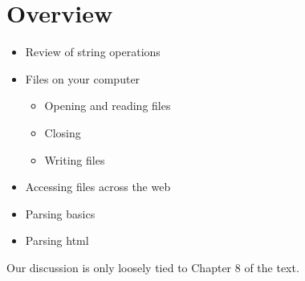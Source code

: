 \documentclass[letterpaper,10pt,english]{sphinxmanual}
\begin{document}
\section{Overview}
\label{\detokenize{lecture_notes/lec13_files_web:overview}}\begin{itemize}
\item {} 
Review of string operations

\item {} 
Files on your computer
\begin{itemize}
\item {} 
Opening and reading files

\item {} 
Closing

\item {} 
Writing files

\end{itemize}

\item {} 
Accessing files across the web

\item {} 
Parsing basics

\item {} 
Parsing html

\end{itemize}

Our discussion is only loosely tied to Chapter 8 of the text.
\end{document}
